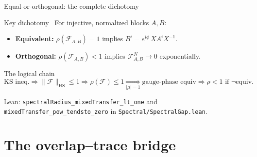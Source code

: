 \documentclass[aspectratio=169,10pt]{beamer}
\newcommand{\cF}{\mathcal{F}}
\newcommand{\HS}{\mathrm{HS}}
\begin{document}
\begin{frame}{Equal-or-orthogonal: the complete dichotomy}
    \vspace{-0.6em}

    \begin{block}{Key dichotomy~\cite{Perez-Garcia2007Matrix,Cirac2021Matrix}}
        For injective, normalized blocks $A,B$:
        \begin{itemize}\itemsep0.2em
            \item \textbf{Equivalent:}
                  $\rho(\cF_{A,B})=1$ implies $B^i = e^{i\phi}\, X A^i X^{-1}$.
            \item \textbf{Orthogonal:}
                  $\rho(\cF_{A,B})<1$ implies $\cF_{A,B}^N\to 0$ exponentially.
        \end{itemize}
    \end{block}

    \begin{block}{The logical chain}
        \[
            \text{KS ineq.} \Rightarrow  \|\cF\|_{\HS}\le 1
            \Rightarrow  \rho(\cF)\le 1
            \underset{|\mu|=1}{\Longrightarrow}  \text{gauge-phase equiv}
            \Rightarrow  \rho<1 \text{ if } \lnot\text{equiv}.
        \]
    \end{block}

    \textcolor{dimwhite}{\footnotesize Lean: \texttt{spectralRadius\_mixedTransfer\_lt\_one} and
        \texttt{mixedTransfer\_pow\_tendsto\_zero} in \texttt{Spectral/SpectralGap.lean}.}
\end{frame}

\section{The overlap--trace bridge}
\end{document}

